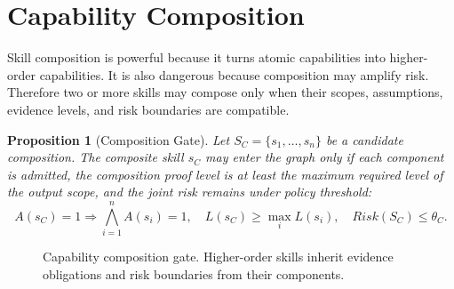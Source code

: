 \documentclass[10.5pt]{article}
\theoremstyle{goThm}
\newtheorem{proposition}{Proposition}
\begin{document}
\section{Capability Composition}
Skill composition is powerful because it turns atomic capabilities into higher-order capabilities. It is also dangerous because composition may amplify risk. Therefore two or more skills may compose only when their scopes, assumptions, evidence levels, and risk boundaries are compatible.

\begin{proposition}[Composition Gate]
Let \(S_C=\{s_1,\dots,s_n\}\) be a candidate composition. The composite skill \(s_C\) may enter the graph only if each component is admitted, the composition proof level is at least the maximum required level of the output scope, and the joint risk remains under policy threshold:
\begin{equation}
A(s_C)=1 \Rightarrow \bigwedge_{i=1}^{n} A(s_i)=1, \quad L(s_C) \ge \max_i L(s_i), \quad Risk(S_C)\le \theta_{C}.
\end{equation}
\end{proposition}

\begin{figure}[H]
\centering
{}
\caption{Capability composition gate. Higher-order skills inherit evidence obligations and risk boundaries from their components.}
\label{fig:composition}
\end{figure}
\end{document}
